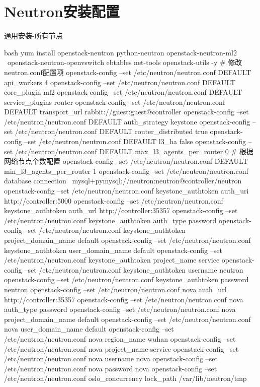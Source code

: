 \section{Neutron安装配置}
\begin{outline}[enumerate]

\1 通用安装-所有节点
\begin{code-in-enumerate}{bash}
yum install openstack-neutron python-neutron openstack-neutron-ml2 \
    openstack-neutron-openvswitch ebtables net-tools openstack-utils  -y
# 修改neutron.conf配置项
openstack-config --set /etc/neutron/neutron.conf DEFAULT api_workers 4
openstack-config --set /etc/neutron/neutron.conf DEFAULT core_plugin ml2
openstack-config --set /etc/neutron/neutron.conf DEFAULT service_plugins router
openstack-config --set /etc/neutron/neutron.conf DEFAULT transport_url rabbit://guest:guest@controller
openstack-config --set /etc/neutron/neutron.conf DEFAULT auth_strategy keystone
openstack-config --set /etc/neutron/neutron.conf DEFAULT router_distributed true
openstack-config --set /etc/neutron/neutron.conf DEFAULT l3_ha false
openstack-config --set /etc/neutron/neutron.conf DEFAULT max_l3_agents_per_router 0
# 根据网络节点个数配置
openstack-config --set /etc/neutron/neutron.conf DEFAULT min_l3_agents_per_router 1
openstack-config --set /etc/neutron/neutron.conf database connection \
    mysql+pymysql://neutron:neutron@controller/neutron
openstack-config --set /etc/neutron/neutron.conf keystone_authtoken auth_uri http://controller:5000
openstack-config --set /etc/neutron/neutron.conf keystone_authtoken auth_url http://controller:35357
openstack-config --set /etc/neutron/neutron.conf keystone_authtoken auth_type password
openstack-config --set /etc/neutron/neutron.conf keystone_authtoken project_domain_name default
openstack-config --set /etc/neutron/neutron.conf keystone_authtoken user_domain_name default
openstack-config --set /etc/neutron/neutron.conf keystone_authtoken project_name service
openstack-config --set /etc/neutron/neutron.conf keystone_authtoken username neutron
openstack-config --set /etc/neutron/neutron.conf keystone_authtoken password neutron
openstack-config --set /etc/neutron/neutron.conf nova auth_url http://controller:35357
openstack-config --set /etc/neutron/neutron.conf nova auth_type password
openstack-config --set /etc/neutron/neutron.conf nova project_domain_name default
openstack-config --set /etc/neutron/neutron.conf nova user_domain_name default
openstack-config --set /etc/neutron/neutron.conf nova region_name wuhan
openstack-config --set /etc/neutron/neutron.conf nova project_name service
openstack-config --set /etc/neutron/neutron.conf nova username nova
openstack-config --set /etc/neutron/neutron.conf nova password nova
openstack-config --set /etc/neutron/neutron.conf oslo_concurrency lock_path /var/lib/neutron/tmp


\end{code-in-enumerate}
\end{outline}
